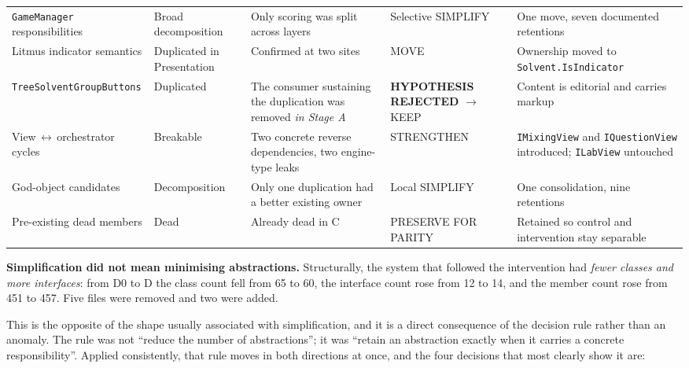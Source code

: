 \documentclass[pdflatex,sn-basic]{sn-jnl}
\begin{document}
\begin{longtable}{@{}p{}p{}p{}p{}p{}@{}}
\addlinespace
\texttt{GameManager} responsibilities & Broad decomposition & Only scoring was split across layers & Selective SIMPLIFY & One move, seven documented retentions \\
\addlinespace
Litmus indicator semantics & Duplicated in Presentation & Confirmed at two sites & MOVE & Ownership moved to \texttt{Solvent.\allowbreak{}IsIndicator} \\
\addlinespace
\texttt{TreeSolvent\allowbreak{}GroupButtons} & Duplicated & The consumer sustaining the duplication was removed \emph{in Stage A} & \textbf{HYPOTHESIS REJECTED} $\rightarrow$ KEEP & Content is editorial and carries markup \\
\addlinespace
View\,$\leftrightarrow$\,orchestrator cycles & Breakable & Two concrete reverse dependencies, two engine-type leaks & STRENGTHEN & \texttt{IMixingView} and \texttt{IQuestionView} introduced; \texttt{ILabView} untouched \\
\addlinespace
God-object candidates & Decomposition & Only one duplication had a better existing owner & Local SIMPLIFY & One consolidation, nine retentions \\
\addlinespace
Pre-existing dead members & Dead & Already dead in C & PRESERVE FOR PARITY & Retained so control and intervention stay separable \\
\end{longtable}
\endgroup


\medskip\noindent\textbf{Simplification did not mean minimising abstractions.} Structurally, the system that followed the intervention had \emph{fewer classes and more interfaces}: from D0 to D the class count fell from 65 to 60, the interface count rose from 12 to 14, and the member count rose from 451 to 457. Five files were removed and two were added.

This is the opposite of the shape usually associated with simplification, and it is a direct consequence of the decision rule rather than an anomaly. The rule was not ``reduce the number of abstractions''; it was ``retain an abstraction exactly when it carries a concrete responsibility''. Applied consistently, that rule moves in both directions at once, and the four decisions that most clearly show it are:
\end{document}

